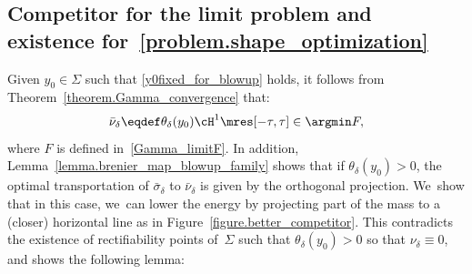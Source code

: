 \subsection{Competitor for the limit problem and existence for~\eqref{problem.shape_optimization}}

Given $y_0\in \Sigma$ such that \eqref{y0fixed_for_blowup} holds, it follows from Theorem~\ref{theorem.Gamma_convergence} that:
\[
\bar \nu_{\delta} \eqdef \theta_\delta(y_0)\cH^1\mres [-\tau, \tau]
\in
\argmin F,
\]
where $F$ is defined in~\eqref{Gamma_limitF}.
In addition, Lemma~\ref{lemma.brenier_map_blowup_family} shows that if $\theta_\delta(y_0)>0$, the optimal transportation of $\bar \sigma_{\delta}$ to $\bar \nu_{\delta}$ is given by the orthogonal projection. We~show that in this case, we~can lower the energy by projecting part of the mass to a (closer) horizontal line as in Figure~\ref{figure.better_competitor}.
This contradicts the existence of rectifiability points of~$\Sigma$ such that $\theta_\delta(y_0) > 0$ so that $\nu_\delta \equiv 0$, and shows the following lemma:


